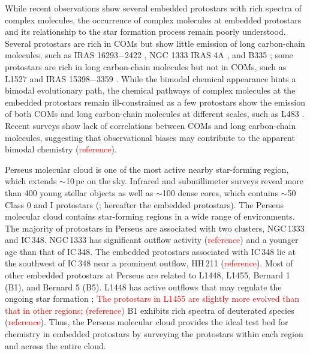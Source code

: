 \documentclass[twocolumn]{aastex62}
\newcommand{\refnote}{\textcolor{red}{reference}}
\begin{document}
While recent observations show several embedded protostars with rich spectra of complex molecules, the occurrence of complex molecules at embedded protostars and its relationship to the star formation process remain poorly understood.  Several protostars are rich in COMs but show little emission of long carbon-chain molecules, such as IRAS 16293$-$2422 \citep{2016A&A...595A.117J}, NGC 1333 IRAS 4A \citep{2004ApJ...615..354B,2019ApJ...872..196S}, and B335 \citep{2016ApJ...830L..37I,2019ApJ...873L..21I}; some protostars are rich in long carbon-chain molecules but not in COMs, such as L1527 \citep{2010ApJ...722.1633S} and IRAS 15398$-$3359 \citep{2009ApJ...697..769S}.  While the bimodal chemical appearance hints a bimodal evolutionary path, the chemical pathways of complex molecules at the embedded protostars remain ill-constrained as a few protostars show the emission of both COMs and long carbon-chain molecules at different scales, such as L483 \citep{2017ApJ...837..174O}.  Recent surveys show lack of correlations between COMs and long carbon-chain molecules, suggesting that observational biases may contribute to the apparent bimodal chemistry \citep{2016ApJ...833..125G,2018ApJS..236...52H} (\refnote).

Perseus molecular cloud is one of the most active nearby star-forming region, which extends $\sim$10\,pc on the sky.  Infrared and submillimeter surveys reveal more than 400 young stellar objects as well as $\sim$100 dense cores, which contains $\sim$50 Class 0 and I protostars (\citealt{2005A&A...440..151H,2008ApJ...683..822J,2013AJ....145...94D}; hereafter the embedded protostars).  The Perseus molecular cloud contains star-forming regions in a wide range of environments.  The majority of protostars in Perseus are associated with two clusters, NGC\,1333 and IC\,348.  NGC\,1333 has significant outflow activity (\refnote) and a younger age than that of IC\,348.  The embedded protostars associated with IC\,348 lie at the southwest of IC\,348 near a prominent outflow, HH\,211 (\refnote).  Most of other embedded protostars at Perseus are related to L1448, L1455, Bernard 1 (B1), and Bernard 5 (B5).  L1448 has active outflows that may regulate the ongoing star formation \citep{2010MNRAS.408.1516C}; \textcolor{red}{The protostars in L1455 are slightly more evolved than that in other regions; (\refnote)} B1 exhibits rich spectra of deuterated species (\refnote).  Thus, the Perseus molecular cloud provides the ideal test bed for chemistry in embedded protostars by surveying the protostars within each region and across the entire cloud.
\end{document}
